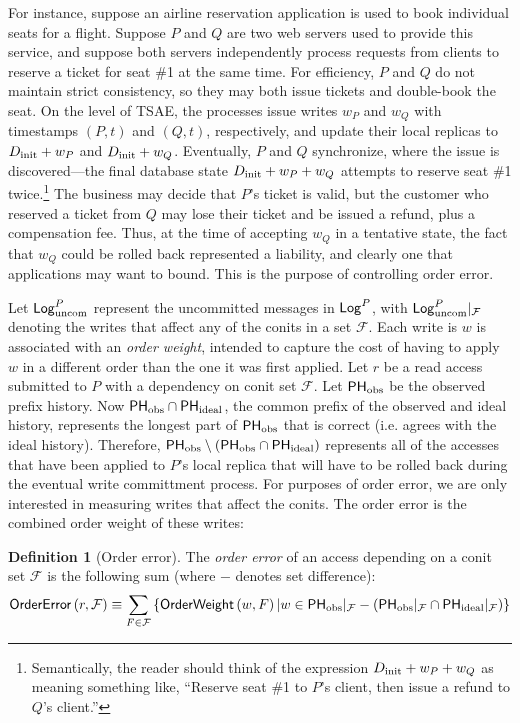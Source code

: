 \documentclass[]             %
{NASA}                       %
\theoremstyle{definition}
\newtheorem{definition}[theorem]{Definition}
\begin{document}
For instance, suppose an airline reservation application is used to
book individual seats for a flight. Suppose $P$ and $Q$ are two web
servers used to provide this service, and suppose both servers
independently process requests from clients to reserve a ticket for
seat \#1 at the same time. For efficiency, $P$ and $Q$ do not maintain
strict consistency, so they may both issue tickets and double-book the
seat. On the level of TSAE, the processes issue writes $w_P$ and $w_Q$
with timestamps $(P, t)$ and $(Q, t)$, respectively, and update their
local replicas to $D_\textrm{init} + w_P$ and $D_\textrm{init} + w_Q$. Eventually, $P$
and $Q$ synchronize, where the issue is discovered---the final
database state \mbox{$D_\textrm{init} + w_P + w_Q$} attempts to reserve seat
\#1 twice.\footnote{Semantically, the reader should think of the
  expression $D_\textrm{init} + w_P + w_Q$ as meaning something like, ``Reserve
  seat \#1 to $P$'s client, then issue a refund to $Q$'s client.''}
The business may decide that $P$'s ticket is valid, but the customer
who reserved a ticket from $Q$ may lose their ticket and be issued a
refund, plus a compensation fee. Thus, at the time of accepting $w_Q$
in a tentative state, the fact that $w_Q$ could be rolled back
represented a liability, and clearly one that applications may want to
bound. This is the purpose of controlling order error.

Let $\mathsf{Log}_{\textrm{uncom}}^{P}$ represent the uncommitted messages in $\mathsf{Log}^{P}$,
with $\mathsf{Log}_{\textrm{uncom}}^{P}|_{\mathcal{F}}$ denoting the writes that affect
any of the conits in a set $\mathcal{F}$. Each write is $w$ is
associated with an \emph{order weight}, intended to capture the cost
of having to apply $w$ in a different order than the one it was first
applied. Let $r$ be a read access submitted to $P$ with a dependency
on conit set $\mathcal{F}$. Let $\mathsf{PH}_{\textrm{obs}}$ be the observed
prefix history. Now $\mathsf{PH}_{\textrm{obs}} \cap \mathsf{PH}_{\textrm{ideal}}$,
the common prefix of the observed and ideal history, represents the
longest part of $\mathsf{PH}_{\textrm{obs}}$ that is correct (i.e. agrees with
the ideal history). Therefore,
$\mathsf{PH}_{\textrm{obs}} \setminus \left(\mathsf{PH}_{\textrm{obs}} \cap
  \mathsf{PH}_{\textrm{ideal}}\right)$ represents all of the accesses that
have been applied to $P$'s local replica that will have to be rolled
back during the eventual write committment process. For purposes of
order error, we are only interested in measuring writes that affect
the conits. The order error is the combined order weight of these
writes:
\begin{definition}[Order error]
  The \emph{order error} of an access depending on a conit set
  $\mathcal{F}$ is the following sum (where $-$ denotes set difference):
  \[
    \mathsf{OrderError}\left(r, \mathcal{F}\right) \equiv \sum_{F \in \mathcal{F}} \left\{\mathsf{OrderWeight}\left(w, F\right) | w \in \mathsf{PH}_{\textrm{obs}}|_{\mathcal{F}} - \left(\mathsf{PH}_{\textrm{obs}}|_{\mathcal{F}} \cap
  \mathsf{PH}_{\textrm{ideal}}|_{\mathcal{F}} \right) \right\}
\]
\end{definition}
\end{document}
